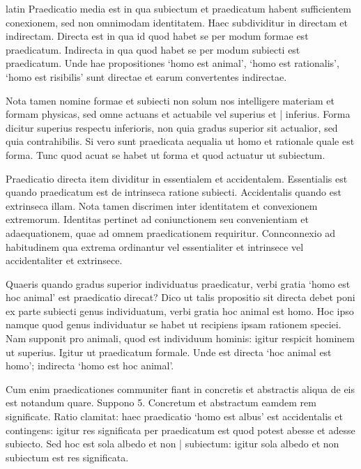 \begin{otherlanguage*}{latin}
\pstart
Praedicatio media est in qua subiectum et praedicatum habent sufficientem conexionem, sed non omnimodam identitatem. Haec subdividitur in directam et indirectam. Directa est in qua id quod habet se per modum formae est praedicatum. Indirecta in qua quod habet se per modum subiecti est praedicatum. Unde hae propositiones `homo est animal', `homo est rationalis', `homo est risibilis' sunt directae et earum convertentes indirectae. 
\pend

\pstart
Nota tamen nomine formae et subiecti non solum nos intelligere materiam et formam physicas, sed omne actuans et actuabile vel superius et \textnormal{|} inferius. Forma dicitur superius respectu inferioris, non quia gradus superior sit actualior, sed quia contrahibilis. Si vero sunt praedicata aequalia ut homo et rationale quale est forma. Tunc quod acuat se habet ut forma et quod actuatur ut subiectum. 
\pend

\pstart
Praedicatio directa item dividitur in essentialem et accidentalem. Essentialis est quando praedicatum est de intrinseca ratione subiecti. Accidentalis quando est extrinseca illam. Nota tamen discrimen inter identitatem et convexionem extremorum. Identitas pertinet ad coniunctionem seu convenientiam et adaequationem, quae ad omnem praedicationem requiritur. Connconnexio ad habitudinem qua extrema ordinantur vel essentialiter et intrinsece vel accidentaliter et extrinsece. 
\pend

\pstart
Quaeris quando gradus superior individuatus praedicatur, verbi gratia `homo est hoc animal' est praedicatio direcat? Dico ut talis propositio sit directa debet poni ex parte subiecti genus individuatum, verbi gratia hoc animal est homo. Hoc ipso namque quod genus individuatur se habet ut recipiens ipsam rationem  speciei. Nam supponit pro animali, quod est individuum hominis:
igitur respicit hominem ut superius. Igitur ut praedicatum formale. Unde est directa `hoc animal est homo'; indirecta `homo est hoc animal'. 
\pend

\pstart
Cum enim praedicationes communiter fiant in concretis et abstractis aliqua de eis est notandum quare. Suppono 5. Concretum et abstractum eamdem rem significate. Ratio clamitat:
haec praedicatio `homo est albus' est accidentalis et contingens:
igitur res significata per praedicatum est quod potest abesse et adesse subiecto. Sed hoc est sola albedo et non \textnormal{|} subiectum:
igitur sola albedo et non subiectum est res significata. 
\pend


\end{otherlanguage*}
